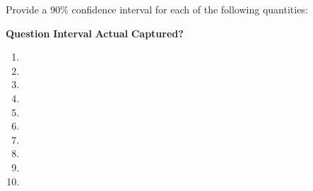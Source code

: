 \documentclass[10pt]{article}\usepackage[]{graphicx}\usepackage[]{color}
\begin{document}
Provide a 90\% confidence interval for each of the following quantities:

\vspace{5mm}

\hfill \textbf{Question} \hfill \textbf{Interval} \hfill \textbf{Actual} \hfill \textbf{Captured?}

\begin{enumerate}
\itemsep0.5in
\item
\item
\item
\item
\item
\item
\item
\item
\item
\item
\end{enumerate}

\newpage
\end{document}
